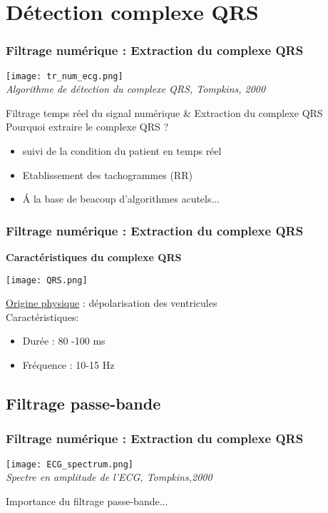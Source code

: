 \documentclass{beamer}
\begin{document}
\section{Détection complexe QRS}
\begin{frame}
\frametitle{Filtrage numérique :  Extraction du complexe QRS}
\begin{center}
\texttt{[image: tr\_num\_ecg.png]}\\
\textit{\footnotesize Algorithme de détection du complexe QRS, Tompkins, 2000}\\
\end{center}
Filtrage temps réel du signal numérique \& Extraction du complexe QRS\\
\vspace{0.3cm}
Pourquoi extraire le complexe QRS ?\\
\vspace{0.2cm}
\begin{itemize}
\item suivi de la condition du patient en temps réel 
\item Etablissement des tachogrammes (RR)
\item \'A la base de beacoup d'algorithmes acutels...
\end{itemize}

\end{frame}

\begin{frame}
\frametitle{Filtrage numérique :  Extraction du complexe QRS}
\textbf{Caractéristiques du complexe QRS}
\begin{center}
\texttt{[image: QRS.png]}\\

\end{center}
\underline{Origine physique} : dépolarisation des ventricules\\
\vspace{0.3cm}
Caractéristiques: \\
\vspace{0.1cm}
\begin{itemize}
\item Durée :  80 -100 ms
\item Fréquence : 10-15 Hz 
\end{itemize}

\end{frame}

\subsection{Filtrage passe-bande}
\begin{frame}
\frametitle{Filtrage numérique :  Extraction du complexe QRS}
\begin{center}
\texttt{[image: ECG\_spectrum.png]}\\
\textit{\scriptsize Spectre en amplitude de l'ECG, Tompkins,2000}\\
\vspace{0.1cm}
\end{center}
Importance du filtrage passe-bande...
\end{frame}
\end{document}
